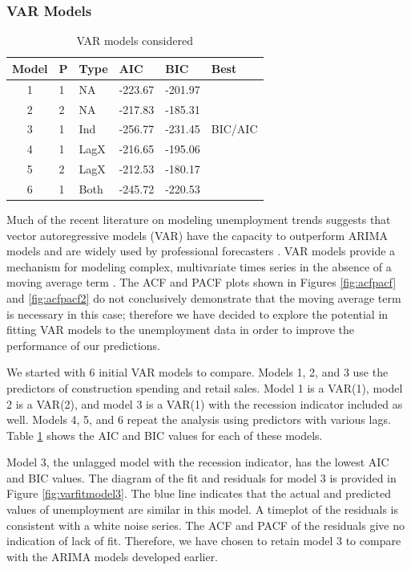 \documentclass[twoside,twocolumn]{article}
\begin{document}
      \subsubsection{VAR Models}
\begin{table}[htb]
\centering
\caption{VAR models considered}
\label{tab:varchoices}
\begin{tabular}{clllll}
  \hline
 Model & P & Type &  AIC & BIC & Best \\
  \hline
1  & 1 & NA  &  -223.67 & -201.97 &  \\
  2  & 2 & NA  &   -217.83 & -185.31 &  \\
  3  & 1 & Ind  & -256.77 & -231.45 & BIC/AIC \\
  4  & 1 & LagX & -216.65 & -195.06 &  \\
  5  & 2 & LagX & -212.53 & -180.17 &  \\
  6  & 1 & Both  & -245.72 & -220.53 &  \\
   \hline
\end{tabular}
\end{table}



     Much of the recent literature on modeling unemployment trends suggests that vector autoregressive models (VAR) have the capacity to outperform ARIMA models and are widely used by professional forecasters \citep{Meyer2015, Tasci2015, Barnichon2016}. VAR models provide a mechanism for modeling complex, multivariate times series in the absence of a moving average term \citep{Chatfield2001} . The ACF and PACF plots shown in Figures \ref{fig:acfpacf} and \ref{fig:acfpacf2} do not conclusively demonstrate that the moving average term is necessary in this case; therefore we have decided to explore the potential in fitting VAR models to the unemployment data in order to improve the performance of our predictions.

We started  with 6 initial VAR models to compare. Models 1, 2, and 3 use the predictors of construction spending and retail sales. Model 1 is a VAR(1), model 2 is a VAR(2), and model 3 is a VAR(1) with the recession indicator included as well. Models 4, 5, and 6 repeat the analysis using predictors with various lags. Table \ref{tab:varchoices} shows the AIC and BIC values for each of these models.

Model 3, the unlagged model with the recession indicator, has the lowest AIC and BIC values.  The diagram of the fit and residuals for model 3 is provided in Figure \ref{fig:varfitmodel3}. The blue line indicates that the actual and predicted values of unemployment are similar in this model. A timeplot of the residuals is consistent with a white noise series. The ACF and PACF of the residuals give no indication of lack of fit. Therefore, we have chosen to retain model 3 to compare with the ARIMA models developed earlier.
\end{document}
